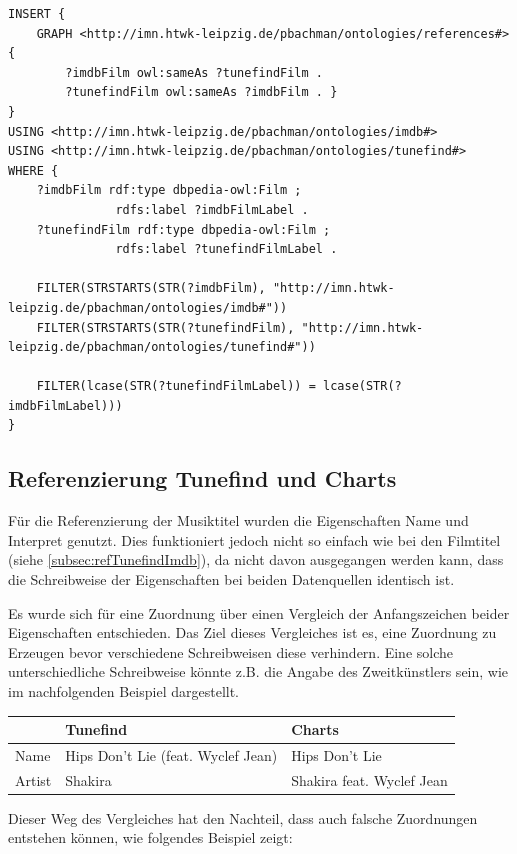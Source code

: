 \documentclass[parskip]{scrartcl}
\begin{document}
\begin{lstlisting}[caption={SPARQL-Query zur Referenzierung von Tunefind und IMDb}, label={lst:refTunefindImdb}]
INSERT {
    GRAPH <http://imn.htwk-leipzig.de/pbachman/ontologies/references#> { 
        ?imdbFilm owl:sameAs ?tunefindFilm .
        ?tunefindFilm owl:sameAs ?imdbFilm . }
}
USING <http://imn.htwk-leipzig.de/pbachman/ontologies/imdb#>
USING <http://imn.htwk-leipzig.de/pbachman/ontologies/tunefind#>
WHERE {
    ?imdbFilm rdf:type dbpedia-owl:Film ;
               rdfs:label ?imdbFilmLabel .
    ?tunefindFilm rdf:type dbpedia-owl:Film ;
               rdfs:label ?tunefindFilmLabel .
    
    FILTER(STRSTARTS(STR(?imdbFilm), "http://imn.htwk-leipzig.de/pbachman/ontologies/imdb#"))
    FILTER(STRSTARTS(STR(?tunefindFilm), "http://imn.htwk-leipzig.de/pbachman/ontologies/tunefind#"))
    
    FILTER(lcase(STR(?tunefindFilmLabel)) = lcase(STR(?imdbFilmLabel)))
}
\end{lstlisting}

\subsection{Referenzierung Tunefind und Charts}
Für die Referenzierung der Musiktitel wurden die Eigenschaften Name und Interpret genutzt. Dies funktioniert jedoch nicht so einfach wie bei den Filmtitel (siehe \ref{subsec:refTunefindImdb}), da nicht davon ausgegangen werden kann, dass die Schreibweise der Eigenschaften bei beiden Datenquellen identisch ist.

Es wurde sich für eine Zuordnung über einen Vergleich der Anfangszeichen beider Eigenschaften entschieden. Das Ziel dieses Vergleiches ist es, eine Zuordnung zu Erzeugen bevor verschiedene Schreibweisen diese verhindern. Eine solche unterschiedliche Schreibweise könnte z.B. die Angabe des Zweitkünstlers sein, wie im nachfolgenden Beispiel dargestellt.

\begin{tabular}{p{}|p{}|p{}}
     & \textbf{Tunefind} & \textbf{Charts} \\\hline
    Name & Hips Don't Lie (feat. Wyclef Jean)  & Hips Don't Lie\\
    Artist & Shakira & Shakira feat. Wyclef Jean\\
\end{tabular}

Dieser Weg des Vergleiches hat den Nachteil, dass auch falsche Zuordnungen entstehen können, wie folgendes Beispiel zeigt:
\end{document}
